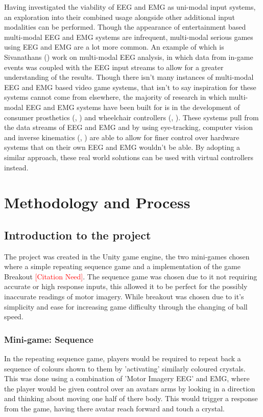 \documentclass[11pt, a4paper]{article}
\newcommand{\addcitation}{\textcolor{red}{[Citation Need]}}
\newcommand{\ccite}[1]{(\citeauthor{#1}, \citeyear{#1})}
\newcommand{\cciteyear}[1]{(\citeyear{#1})}
\begin{document}
\hfill
  
Having investigated the viability of EEG and EMG as uni-modal input systems, an exploration into their combined usage alongside other additional input modalities can be performed. Though the appearance of entertainment based multi-modal EEG and EMG systems are infrequent, multi-modal serious games using EEG and EMG are a lot more common. An example of which is Sivanathans \cciteyear{sivanathan2014temporal} work on multi-modal EEG analysis, in which data from in-game events was coupled with the EEG input streams to allow for a greater understanding of the results. Though there isn't many instances of multi-modal EEG and EMG based video game systems, that isn't to say inspiration for these systems cannot come from elsewhere, the majority of research in which multi-modal EEG and EMG systems have been built for is in the development of consumer prosthetics \ccite{shi2019novel} and wheelchair controllers \ccite{carlson2013brain}. These systems pull from the data streams of EEG and EMG and by using eye-tracking, computer vision and inverse kinematics \ccite{mcmullen2013demonstration} are able to allow for finer control over hardware systems that on their own EEG and EMG wouldn't be able. By adopting a similar approach, these real world solutions can be used with virtual controllers instead. 


\pagebreak
\section{Methodology and Process}			%


\subsection{Introduction to the project}
The project was created in the Unity game engine, the two mini-games chosen where a simple repeating sequence game and a implementation of the game Breakout \addcitation{}. The sequence game was chosen due to it not requiring accurate or high response inputs, this allowed it to be perfect for the possibly inaccurate readings of motor imagery. While breakout was chosen due to it's simplicity and ease for increasing game difficulty through the changing of ball speed. 

\subsubsection{Mini-game: Sequence}
In the repeating sequence game, players would be required to repeat back a sequence of colours shown to them by 'activating' similarly coloured crystals. This was done using a combination of 'Motor Imagery EEG' and EMG, where the player would be given control over an avatars arms by looking in a direction and thinking about moving one half of there body. This would trigger a response from the game, having there avatar reach forward and touch a crystal.
\end{document}
